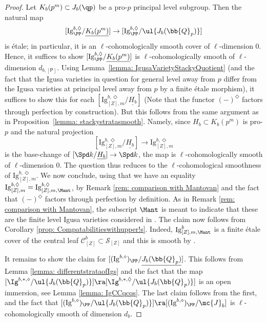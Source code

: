 \documentclass[letterpaper,11pt]{amsart}
\begin{document}
\begin{proof}
    Let $K_b(p^m)\subset J_b(\qp)$ be a pro-$p$ principal level subgroup. Then the natural map
    \[[\mathrm{Ig}^{b,\Diamond}_{\PP}/\underline{K_b(p^m)}]\to [\mathrm{Ig}^{b,\Diamond}_{\PP}/\ul{J_{b}(\bb{Q}_{p})}] \]
    is \'etale; in particular, it is an $\ell$-cohomologically smooth cover of $\ell$-dimension $0$. Hence, it suffices to show $[\mathrm{Ig}^{b,\Diamond}_{\PP}/\underline{K_b(p^m)}]$ is $\ell$-cohomologically smooth of $\ell$-dimension $d_{b,[\mathsf{P}]}$. Using Lemma~\ref{lemma: IgusaVarietyStackyQuotient} (and the fact that the Igusa varieties in question for general level away from $p$ differ from the Igusa varieties at principal level away from $p$ by a finite \'etale morphism), it suffices to show this for each $[\mathrm{Ig}^{b,\Diamond}_{[Z], m}/\underline{H_b}]$ (Note that the functor $(-)^{\Diamond}$ factors through perfection by construction). But this follows from the same argument as in Proposition~\ref{lemma: stackystratasmooth}. Namely, since $H_b\subset K_b(p^m)$ is pro-$p$ and the natural projection
    \[[\mathrm{Ig}^{b,\Diamond}_{[Z], m}/\underline{H_b}]\to \mathrm{Ig}^{b,\Diamond}_{[Z], m}\] is the base-change of $[\Spd k/\underline{H_b}]\to \Spd k$, the map is $\ell$-cohomologically smooth of $\ell$-dimension $0$. The question thus reduces to the $\ell$-cohomological smoothness of $\mathrm{Ig}^{b,\Diamond}_{[Z], m}$. We now conclude, using that we have an equality $\mathrm{Ig}^{b,\Diamond}_{[Z], m} = \mathrm{Ig}^{b,\Diamond}_{[Z],m,\Mant}$, by Remark \ref{rem: comparison with Mantovan} and the fact that $(-)^{\Diamond}$ factors through perfection by definition. As in Remark \ref{rem: comparison with Mantovan}, the subscript $\Mant$ is meant to indicate that these are the finite level Igusa varieties considered in \cite{Mant,CS17,CS2}.  The claim now follows from Corollary \ref{prop: Compatabilitieswithupper!s}. Indeed, $\mathrm{Ig}^{b}_{[Z], m, \Mant}$ is a finite \'etale cover of the central leaf $\mathscr{C}^b_{[Z]}\subset \mathscr{S}_{[Z]}$ and this is smooth by \cite[Proposition~1]{mantovan-PEL}. 
    
    It remains to show the claim for $[(\mathrm{Ig}^{b,\diamond})_{\PP}/\underline{J_{b}(\bb{Q}_{p})}]$. This follows from Lemma \ref{lemma: differentstrataofIgs} and the fact that the map $[\Ig^{b,*,\diamond}/\ul{J_{b}(\bb{Q}_{p})}] \ra [\Ig^{b,*,\Diamond}/\ul{J_{b}(\bb{Q}_{p})}]$ is an open immersion, see Lemma \ref{lemma: IgCCqcqs}. The last claim follows from the first, and the fact that $[(\mathrm{Ig}^{b,\diamond})_{\PP}/\ul{J_{b}(\bb{Q}_{p})}] \ra [(\mathrm{Ig}^{b,\diamond})_{\PP}/\mc{J}_b]$ is $\ell$-cohomologically smooth of dimension $d_{b}$.
\end{proof}
\end{document}
